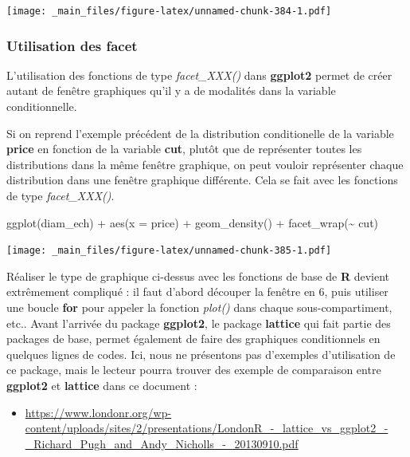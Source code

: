 \documentclass[
]{book}
\newenvironment{Shaded}{\begin{snugshade}}{\end{snugshade}}
\newcommand{\AttributeTok}[1]{\textcolor[rgb]{0.77,0.63,0.00}{#1}}
\newcommand{\FunctionTok}[1]{\textcolor[rgb]{0.00,0.00,0.00}{#1}}
\newcommand{\NormalTok}[1]{#1}
\newcommand{\SpecialCharTok}[1]{\textcolor[rgb]{0.00,0.00,0.00}{#1}}
\providecommand{\tightlist}{%
  \setlength{\itemsep}{0pt}\setlength{\parskip}{0pt}}
\theoremstyle{definition}
\theoremstyle{definition}
\theoremstyle{definition}
\theoremstyle{definition}
\theoremstyle{remark}
\begin{document}
\texttt{[image: \_main\_files/figure-latex/unnamed-chunk-384-1.pdf]}

\hypertarget{utilisation-des-facet}{%
\subsubsection{Utilisation des facet}\label{utilisation-des-facet}}

L'utilisation des fonctions de type \emph{facet\_XXX()} dans \textbf{ggplot2} permet de créer autant de fenêtre graphiques qu'il y a de modalités dans la variable conditionnelle.

Si on reprend l'exemple précédent de la distribution conditionelle de la variable \textbf{price} en fonction de la variable \textbf{cut}, plutôt que de représenter toutes les distributions dans la même fenêtre graphique, on peut vouloir représenter chaque distribution dans une fenêtre graphique différente. Cela se fait avec les fonctions de type \emph{facet\_XXX()}.

\begin{Shaded}
\begin{Highlighting}[]
\FunctionTok{ggplot}\NormalTok{(diam\_ech) }\SpecialCharTok{+}
  \FunctionTok{aes}\NormalTok{(}\AttributeTok{x =}\NormalTok{ price) }\SpecialCharTok{+} 
  \FunctionTok{geom\_density}\NormalTok{() }\SpecialCharTok{+}
  \FunctionTok{facet\_wrap}\NormalTok{(}\SpecialCharTok{\textasciitilde{}}\NormalTok{ cut)}
\end{Highlighting}
\end{Shaded}

\texttt{[image: \_main\_files/figure-latex/unnamed-chunk-385-1.pdf]}

Réaliser le type de graphique ci-dessus avec les fonctions de base de \textbf{R} devient extrêmement compliqué : il faut d'abord découper la fenêtre en 6, puis utiliser une boucle \textbf{for} pour appeler la fonction \emph{plot()} dans chaque sous-compartiment, etc.. Avant l'arrivée du package \textbf{ggplot2}, le package \textbf{lattice} qui fait partie des packages de base, permet également de faire des graphiques conditionnels en quelques lignes de codes. Ici, nous ne présentons pas d'exemples d'utilisation de ce package, mais le lecteur pourra trouver des exemple de comparaison entre \textbf{ggplot2} et \textbf{lattice} dans ce document :

\begin{itemize}
\tightlist
\item
  \url{https://www.londonr.org/wp-content/uploads/sites/2/presentations/LondonR_-_lattice_vs_ggplot2_-_Richard_Pugh_and_Andy_Nicholls_-_20130910.pdf}
\end{itemize}
\end{document}
